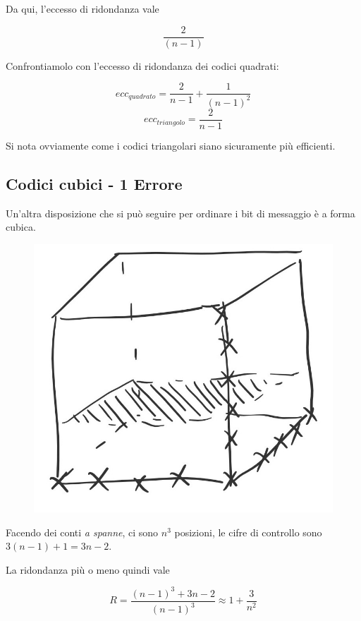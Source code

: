 \newpage

Da qui, l'eccesso di ridondanza vale

\begin{equation}
\frac{2}{(n-1)}
\end{equation}

Confrontiamolo con l'eccesso di ridondanza dei codici quadrati:

\begin{equation*}
ecc_{quadrato} = \frac{2}{n-1}+\frac{1}{(n-1)^2}
\end{equation*}
\begin{equation*}
ecc_{triangolo} = \frac{2}{n-1}
\end{equation*}

Si nota ovviamente come i codici triangolari siano sicuramente più efficienti.

\subsection*{Codici cubici - 1 Errore}

Un'altra disposizione che si può seguire per ordinare i bit di messaggio è a forma cubica.

\begin{figure}[h]
	\centering
	\includegraphics[width=0.6\linewidth]{immagini/img5}
\end{figure}

Facendo dei conti \textit{a spanne}, ci sono $n^3$ posizioni, le cifre di controllo sono $3(n-1) + 1 = 3n-2$.

La ridondanza più o meno quindi vale

\begin{equation}
R = \frac{(n-1)^3+3n-2}{(n-1)^3} \approx 1 + \frac{3}{n^2}
\end{equation}

